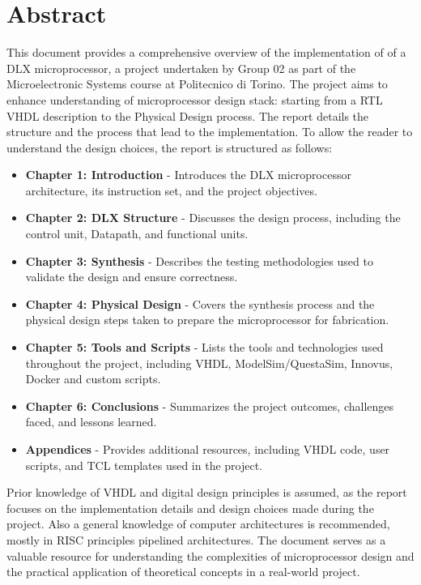 \chapter{Abstract}
\label{Abstract}
This document provides a comprehensive overview of the implementation of  of a DLX microprocessor, a project undertaken by Group 02 as part of the Microelectronic Systems course at Politecnico di Torino. The project aims to enhance understanding of microprocessor design stack: starting from a RTL VHDL description to the Physical Design process. The report details the structure and the process that lead to the implementation. 
To allow the reader to understand the design choices, the report is structured as follows:
\begin{itemize}
    \item \textbf{Chapter 1: Introduction} - Introduces the DLX microprocessor architecture, its instruction set, and the project objectives.
    \item \textbf{Chapter 2: DLX Structure} - Discusses the design process, including the control unit, Datapath, and functional units.
    \item \textbf{Chapter 3: Synthesis} - Describes the testing methodologies used to validate the design and ensure correctness.
    \item \textbf{Chapter 4: Physical Design} - Covers the synthesis process and the physical design steps taken to prepare the microprocessor for fabrication.
    \item \textbf{Chapter 5: Tools and Scripts} - Lists the tools and technologies used throughout the project, including VHDL, ModelSim/QuestaSim, Innovus, Docker and custom scripts.
    \item \textbf{Chapter 6: Conclusions} - Summarizes the project outcomes, challenges faced, and lessons learned.
    \item \textbf{Appendices} - Provides additional resources, including VHDL code, user scripts, and TCL templates used in the project.
\end{itemize}  
Prior knowledge of VHDL and digital design principles is assumed, as the report focuses on the implementation details and design choices made during the project. Also a general knowledge of computer architectures is recommended, mostly in RISC principles pipelined architectures.
The document serves as a valuable resource for understanding the complexities of microprocessor design and the practical application of theoretical concepts in a real-world project.

